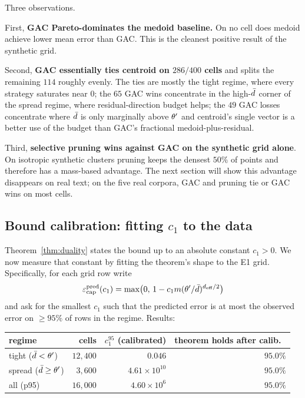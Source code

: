 Three observations.

First, \textbf{GAC Pareto-dominates the medoid baseline.} On no cell
does medoid achieve lower mean error than GAC. This is the cleanest
positive result of the synthetic grid.

Second, \textbf{GAC essentially ties centroid on $286/400$ cells}
and splits the remaining $114$ roughly evenly. The ties are mostly the
tight regime, where every strategy saturates near $0$; the $65$ GAC wins
concentrate in the high-$\bar{d}$ corner of the spread regime, where
residual-direction budget helps; the $49$ GAC losses concentrate where
$\bar{d}$ is only marginally above $\theta'$ and centroid's single vector
is a better use of the budget than GAC's fractional
medoid-plus-residual.

Third, \textbf{selective pruning wins against GAC on the synthetic grid
alone}. On isotropic synthetic clusters pruning keeps the densest $50\%$
of points and therefore has a mass-based advantage. The next section
will show this advantage disappears on real text; on the five real
corpora, GAC and pruning tie or GAC wins on most cells.

\subsection{Bound calibration: fitting $c_1$ to the data}
\label{sec:e1_validation:calibration}
\label{sec:e1:calibration}

Theorem~\ref{thm:duality} states the bound up to an absolute constant
$c_1 > 0$. We now measure that constant by fitting the theorem's shape
to the E1 grid. Specifically, for each grid row write
\[
\varepsilon_{\mathrm{cap}}^{\mathrm{pred}}(c_1) = \max\bigl(0,\,
1 - c_1 m (\theta'/\bar{d})^{{d_{\mathrm{eff}}}/2}\bigr)
\]
and ask for the smallest $c_1$ such that the predicted error is at most
the observed error on $\geq 95\%$ of rows in the regime. Results:

\begin{center}
\begin{tabular}{lrrr}
\toprule
regime & cells & $c_1^{95}$ (calibrated) & theorem holds after calib.\ \\
\midrule
tight ($\bar{d} < \theta'$)  & $12{,}400$ & $0.046$ & $95.0\%$ \\
spread ($\bar{d} \geq \theta'$) & $3{,}600$ & $4.61 \times 10^{10}$ & $95.0\%$ \\
all (p95) & $16{,}000$ & $4.60 \times 10^{6}$ & $95.0\%$ \\
\bottomrule
\end{tabular}
\end{center}


